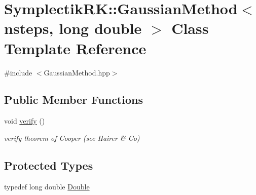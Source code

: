 \hypertarget{classSymplectikRK_1_1GaussianMethod_3_01nsteps_00_01long_01double_01_4}{\section{Symplectik\-R\-K\-:\-:Gaussian\-Method$<$ nsteps, long double $>$ Class Template Reference}
\label{classSymplectikRK_1_1GaussianMethod_3_01nsteps_00_01long_01double_01_4}
}


{\ttfamily \#include $<$Gaussian\-Method.\-hpp$>$}

\subsection*{Public Member Functions}
\begin{DoxyCompactItemize}
\item 
void \hyperlink{classSymplectikRK_1_1GaussianMethod_3_01nsteps_00_01long_01double_01_4_a40f46b89765551b98e71bbd739a4ec58}{verify} ()
\begin{DoxyCompactList}\small\item\em verify theorem of Cooper (see Hairer \& Co) \end{DoxyCompactList}\end{DoxyCompactItemize}
\subsection*{Protected Types}
\begin{DoxyCompactItemize}
\item 
typedef long double \hyperlink{classSymplectikRK_1_1GaussianMethod_3_01nsteps_00_01long_01double_01_4_a69c2e112cef22bfa9b7b1133dc426794}{Double}
\end{DoxyCompactItemize}
